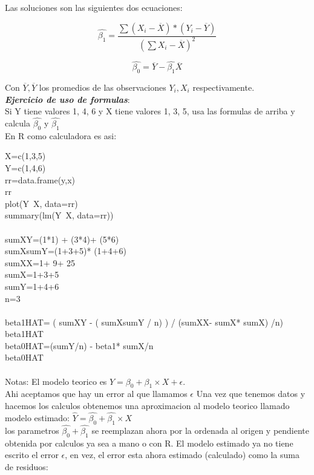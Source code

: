 \documentclass[letterpaper,11pt]{article}\usepackage[]{graphicx}\usepackage[]{color}
\begin{document}
Las soluciones son las siguientes dos ecuaciones:
	
	\begin{equation}
	\hat{\beta_{1}}= \frac {\sum (X_{i} - \overline{X})* (Y_{i} - \overline{Y})} {(\sum X_{i} -\overline{X})^2}
	\end{equation}

	\begin{equation}
	\hat{\beta_{0}}= \overline{Y} - \hat{\beta_{1}} \overline{X}
	\end{equation}
	
Con $\overline{Y}, \overline{Y}$ los promedios de las observaciones $Y_{i}, X_{i}$	respectivamente.\\
\textbf{\textit{Ejercicio de uso de formulas}}:\\
	
Si Y tiene valores 1, 4, 6 y X tiene valores 1, 3, 5, usa las formulas de arriba y calcula $\hat{\beta_{0}}$ y $\hat{\beta_{1}}$ \\
En R como calculadora es asi:

X=c(1,3,5) \\
Y=c(1,4,6) \\
rr=data.frame(y,x) \\
rr \\
plot(Y~X, data=rr) \\
summary(lm(Y~X, data=rr)) \\ \\

sumXY=(1*1) + (3*4)+ (5*6) \\
sumXsumY=(1+3+5)* (1+4+6) \\
sumXX=1+ 9+ 25 \\
sumX=1+3+5 \\
sumY=1+4+6 \\
n=3 \\ \\

beta1HAT= ( sumXY - ( sumXsumY / n) ) / (sumXX- sumX* sumX) /n) \\
beta1HAT \\
beta0HAT=(sumY/n) - beta1* sumX/n \\
beta0HAT \\ \\

Notas:
El modelo teorico es $Y= \beta_{0} + \beta_{1} \times X + \epsilon$. \\Ahi aceptamos que hay un error al que llamamos $\epsilon$
Una vez que tenemos datos y hacemos los calculos obtenemos una aproximacion al modelo teorico llamado 
modelo estimado: $\hat{Y}= \hat{\beta_{0}} + \hat{\beta_{1}} \times X$ \\ 
los parametros $\hat{\beta_{0}} + \hat{\beta_{1}}$ se reemplazan ahora por la ordenada al origen y pendiente obtenida por
calculos ya sea a mano o con R. El modelo estimado ya no tiene escrito el error $\epsilon$,
en vez, el error esta ahora estimado (calculado) como la suma de residuos:  
\end{document}
